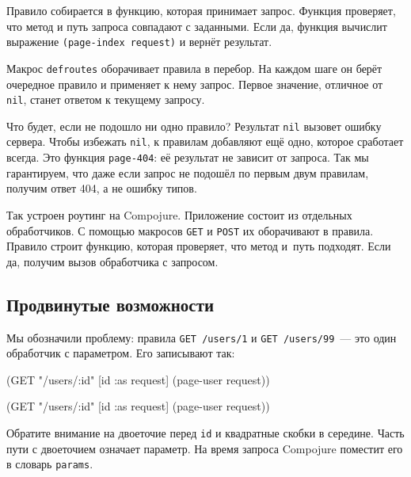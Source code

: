 
Правило собирается в функцию, которая принимает запрос. Функция проверяет, что
метод и путь запроса совпадают с заданными. Если да, функция вычислит выражение
\verb|(page-index request)| и вернёт результат.

Макрос \verb|defroutes| оборачивает правила в перебор. На каждом шаге он берёт
очередное правило и применяет к нему запрос. Первое значение, отличное от
\verb|nil|, станет ответом к текущему запросу.

Что будет, если не подошло ни одно правило? Результат \verb|nil| вызовет
ошибку сервера. Чтобы избежать \verb|nil|, к правилам добавляют ещё одно,
которое сработает всегда. Это функция \verb|page-404|: её результат не
зависит от запроса. Так мы гарантируем, что даже если запрос не подошёл по первым
двум правилам, получим ответ 404, а не ошибку типов.

Так устроен роутинг на Compojure. Приложение состоит из отдельных
обработчиков. С помощью макросов \verb|GET| и \verb|POST| их оборачивают в
правила. Правило строит функцию, которая проверяет, что метод и~путь
подходят. Если да, получим вызов обработчика с запросом.

\subsection{Продвинутые возможности}

Мы обозначили проблему: правила \texttt{GET /users\-/1} и \verb|GET /users/99|~---
это один обработчик с параметром. Его записывают так:


\ifx\DEVICETYPE\MOBILE

\begin{english}
  \begin{clojure}
(GET "/users/:id" [id :as request]
    (page-user request))
  \end{clojure}
\end{english}

\else

\begin{english}
  \begin{clojure}
(GET "/users/:id" [id :as request] (page-user request))
  \end{clojure}
\end{english}

\fi

Обратите внимание на двоеточие перед \verb|id| и квадратные скобки в середине.
Часть пути с двоеточием означает параметр. На время запроса Compojure поместит
его в словарь \verb|params|.

